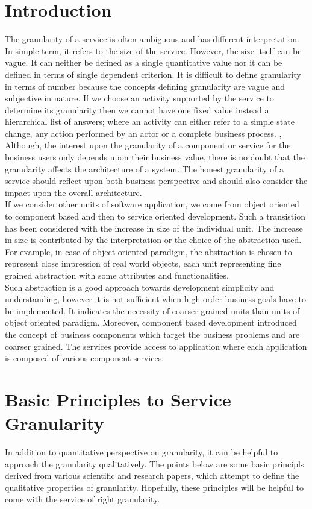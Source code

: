 \section{Introduction}\label{section:granularity/introduction}
The granularity of a service is often ambiguous and has different interpretation. In simple term, it refers to the size of the service. However, the size itself can be vague. It can neither be defined as a single quantitative value nor it can be defined in terms of single dependent criterion. It is difficult to define granularity in terms of number because the concepts defining granularity are vague and subjective in nature. If we choose an activity supported by the service to determine its granularity then we cannot have one fixed value instead a hierarchical list of answers; where an activity can either refer to a simple state change, any action performed by an actor or a complete business process. \cite{Linthicum:2015aa}, \cite{Raf-Haesen:2015aa}
\\
Although, the interest upon the granularity of a component or service for the business users only depends upon their business value, there is no doubt that the granularity affects the architecture of a system. The honest granularity of a service should reflect upon both business perspective and should also consider the impact upon the overall architecture.
\\
If we consider other units of software application, we come from object oriented to component based and then to service oriented development. Such a transistion has been considered with the increase in size of the individual unit. The increase in size is contributed by the interpretation or the choice of the abstraction used. For example, in case of object oriented paradigm, the abstraction is chosen to represent close impression of real world objects, each unit representing fine grained abstraction with some attributes and functionalities. 
\\
Such abstraction is a good approach towards development simplicity and understanding, however it is not sufficient when high order business goals have to be implemented. It indicates the necessity of coarser-grained units than units of object oriented paradigm. Moreover, component based development introduced the concept of business components which target the business problems and are coarser grained. The services provide access to application where each application is composed of various component services. \cite{Linthicum:2015aa}

\section{Basic Principles to Service Granularity}\label{section:granularity/principles}
In addition to quantitative perspective on granularity, it can be helpful to approach the granularity qualitatively. The points below are some basic principls derived from various scientific and research papers, which attempt to define the qualitative properties of granularity. Hopefully, these principles will be helpful to come with the service of right granularity.

